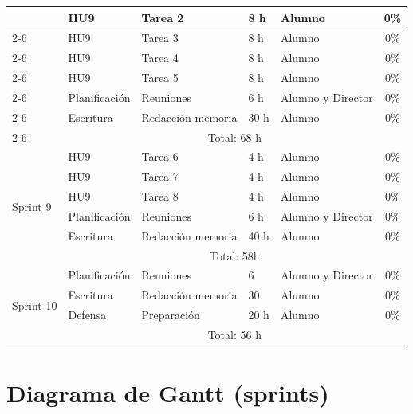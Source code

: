 \documentclass[
11pt, %
]{charter}
\begin{document}
\begin{longtable}{|l|l|p{3cm}|p{1cm}|p{2cm}|c|}
\pagebreak

\multirow{7}{*}{Sprint 8} 
 & HU9 & Tarea 2 & 8 h & Alumno                       & 0\% \\ \cline{2-6} 
 & HU9 & Tarea 3 & 8 h & Alumno                       & 0\% \\ \cline{2-6} 
 & HU9 & Tarea 4 & 8 h & Alumno                       & 0\% \\ \cline{2-6} 
 & HU9 & Tarea 5 & 8 h & Alumno                       & 0\% \\ \cline{2-6} 
 & Planificación & Reuniones & 6 h & Alumno y Director  & 0\% \\ \cline{2-6}
 & Escritura & Redacción memoria & 30 h & Alumno         & 0\% \\ \cline{2-6}
 & \multicolumn{5}{|c|}{Total: 68 h} \\ \hline \hline

\multirow{6}{*}{Sprint 9} 
 & HU9 & Tarea 6 & 4 h & Alumno                       & 0\% \\ \cline{2-6} 
 & HU9 & Tarea 7 & 4 h & Alumno                       & 0\% \\ \cline{2-6} 
 & HU9 & Tarea 8 & 4 h & Alumno                       & 0\% \\ \cline{2-6} 
 & Planificación & Reuniones & 6 h & Alumno y Director  & 0\% \\ \cline{2-6}
 & Escritura & Redacción memoria & 40 h & Alumno         & 0\% \\ \cline{2-6}
 & \multicolumn{5}{|c|}{Total: 58h} \\ \hline \hline

\multirow{4}{*}{Sprint 10} 
 & Planificación & Reuniones & 6 & Alumno y Director  & 0\% \\ \cline{2-6}
 & Escritura & Redacción memoria & 30 & Alumno         & 0\% \\ \cline{2-6}
 & Defensa & Preparación & 20 h & Alumno         & 0\% \\ \cline{2-6}
 & \multicolumn{5}{|c|}{Total: 56 h} \\ \hline \hline

\end{longtable}

\section{Diagrama de Gantt (sprints)}
\label{sec:gantt}
\end{document}
